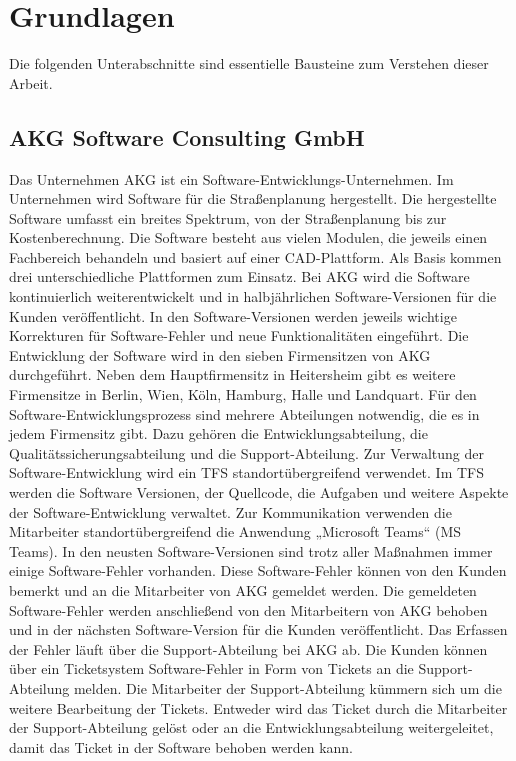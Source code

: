 \section{Grundlagen}
Die folgenden Unterabschnitte sind essentielle Bausteine zum Verstehen dieser Arbeit.
 
\subsection{AKG Software Consulting GmbH}
Das Unternehmen AKG ist ein Software-Entwicklungs-Unternehmen. Im Unternehmen wird Software für die Straßenplanung hergestellt. Die hergestellte Software umfasst ein breites Spektrum, von der Straßenplanung bis zur Kostenberechnung. Die Software besteht aus vielen Modulen, die jeweils einen Fachbereich behandeln und basiert auf
einer CAD-Plattform. Als Basis kommen drei unterschiedliche Plattformen zum Einsatz. Bei AKG wird die Software kontinuierlich weiterentwickelt und in halbjährlichen
Software-Versionen für die Kunden veröffentlicht. In den Software-Versionen werden jeweils wichtige Korrekturen für Software-Fehler und neue Funktionalitäten eingeführt. Die Entwicklung der Software wird in den sieben Firmensitzen von AKG durchgeführt. Neben dem Hauptfirmensitz in Heitersheim gibt es weitere Firmensitze in Berlin, Wien, Köln, Hamburg, Halle und Landquart. Für den Software-Entwicklungsprozess sind mehrere Abteilungen notwendig, die es in jedem Firmensitz gibt. Dazu gehören die Entwicklungsabteilung, die Qualitätssicherungsabteilung und die Support-Abteilung. Zur Verwaltung der Software-Entwicklung wird ein \ac{TFS} standortübergreifend verwendet. Im \ac{TFS} werden die Software Versionen, der Quellcode, die Aufgaben und weitere Aspekte der Software-Entwicklung verwaltet. Zur Kommunikation verwenden die Mitarbeiter standortübergreifend die Anwendung „Microsoft Teams“ (MS Teams). In den neusten Software-Versionen sind trotz aller Maßnahmen immer einige Software-Fehler vorhanden. Diese Software-Fehler können von den Kunden bemerkt und an die Mitarbeiter von AKG gemeldet werden. Die gemeldeten Software-Fehler werden anschließend von den Mitarbeitern von AKG behoben und in der nächsten Software-Version für die Kunden veröffentlicht. Das Erfassen der Fehler läuft über die Support-Abteilung bei AKG ab. Die Kunden können über ein Ticketsystem Software-Fehler in Form von Tickets an die Support-Abteilung melden. Die Mitarbeiter der Support-Abteilung kümmern sich um die weitere Bearbeitung der Tickets. Entweder wird das Ticket durch die Mitarbeiter der Support-Abteilung gelöst oder an die Entwicklungsabteilung weitergeleitet, damit das Ticket in der Software behoben werden kann.

